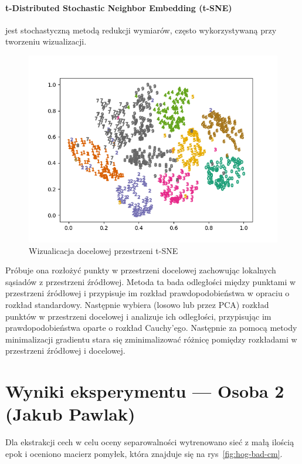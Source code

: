 \documentclass[10pt]{article}
\begin{document}
\paragraph{t-Distributed Stochastic Neighbor Embedding (t-SNE)} jest stochastyczną metodą redukcji wymiarów, często wykorzystywaną przy tworzeniu wizualizacji.

\begin{figure}\centering
    \vspace*{-2em}
    \includegraphics[width=\linewidth]{img/tsne_embedding.png}
    \caption{Wizualicacja docelowej przestrzeni t-SNE}\label{fig:tsne-embed}
\end{figure}

Próbuje ona rozłożyć punkty w przestrzeni docelowej zachowując lokalnych sąsiadów z przestrzeni źródłowej.
Metoda ta bada odległości między punktami w przestrzeni źródłowej i przypisuje im rozkład prawdopodobieństwa w opraciu o rozkład standardowy.
Następnie wybiera (losowo lub przez PCA) rozkład punktów w przestrzeni docelowej i analizuje ich odległości, przypisując im prawdopodobieństwa oparte o rozkład Cauchy'ego.
Następnie za pomocą metody minimalizacji gradientu stara się zminimalizować różnicę pomiędzy rozkładami w przestrzeni źródłowej i docelowej.


\pagebreak

\section{Wyniki eksperymentu --- Osoba 2 (Jakub Pawlak)}

Dla ekstrakcji cech w celu oceny separowalności wytrenowano sieć z małą ilością epok i oceniono macierz pomyłek, która znajduje się na rys~\ref{fig:hog-bad-cm}.
\end{document}
